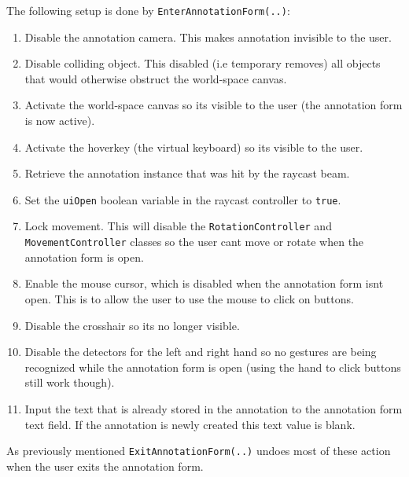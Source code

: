 The following setup is done by \texttt{Enter\-Annotation\-Form(..)}: %
\begin{enumerate}
    \item Disable the annotation camera. This makes annotation invisible to the user.
    \item Disable colliding object. This disabled (i.e temporary removes) all objects that would otherwise obstruct the world-space canvas.
    \item Activate the world-space canvas so its visible to the user (the annotation form is now active).
    \item Activate the hoverkey (the virtual keyboard) so its visible to the user.
    \item Retrieve the annotation instance that was hit by the raycast beam.  
    \item Set the \texttt{uiOpen} boolean variable in the raycast controller to \texttt{true}.
    \item Lock movement. This will disable the \texttt{Rotation\-Controller} and \texttt{Movement\-Controller} classes so the user cant move or rotate when
            the annotation form is open.
    \item Enable the mouse cursor, which is disabled when the annotation form isnt open. This is to allow the user to use the mouse to click on buttons.
    \item Disable the crosshair so its no longer visible.
    \item Disable the detectors for the left and right hand so no gestures are being recognized while the annotation form is open (using the hand to click
            buttons still work though).
    \item Input the text that is already stored in the annotation to the annotation form text field. If the annotation is newly created this text value is blank.
\end{enumerate}

As previously mentioned \texttt{Exit\-Annotation\-Form(..)} undoes most of these action when the user exits the annotation form. 

